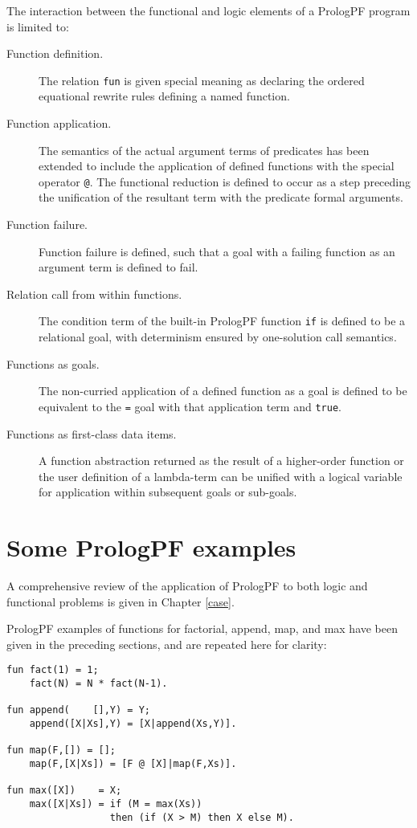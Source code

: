 The interaction between the functional and logic elements of a PrologPF
program is limited to:
\begin{description}
\item[Function definition.]{The relation \texttt{fun} is given special meaning as
  declaring the ordered equational rewrite rules defining a named function.}
\item[Function application.]{The semantics of the actual argument
  terms of predicates has been extended to
  include the application of defined functions
  with the special operator \texttt{@}.  The functional reduction
  is defined to occur as a step preceding the unification of the resultant term
  with the predicate formal arguments.}
\item[Function failure.]{Function failure is defined, such that a goal with a failing
  function as an argument term is defined to fail.}
\item[Relation call from within functions.]{The condition term of the built-in
  PrologPF function \texttt{if} is defined to be a relational goal, with determinism
  ensured by one-solution call semantics.}
\item[Functions as goals.]{The non-curried application of a defined function as a goal is
  defined to be equivalent to the \texttt{=} goal with that application term and
  \texttt{true}.}
\item[Functions as first-class data items.]{A function abstraction returned as the
  result of a higher-order function or the user definition of a lambda-term can be
  unified with a logical variable for application within subsequent goals or sub-goals.}
\end{description}

\section{Some PrologPF examples} %

A comprehensive review of the application of PrologPF to both logic and functional
problems is given in Chapter \ref{case}.

PrologPF examples of functions for factorial, append, map, and max 
have been given in
the preceding sections, and are repeated here for clarity:
\begin{verbatim}
fun fact(1) = 1;
    fact(N) = N * fact(N-1).

fun append(    [],Y) = Y;
    append([X|Xs],Y) = [X|append(Xs,Y)].

fun map(F,[]) = [];
    map(F,[X|Xs]) = [F @ [X]|map(F,Xs)].

fun max([X])    = X;
    max([X|Xs]) = if (M = max(Xs))
                  then (if (X > M) then X else M).
\end{verbatim}

